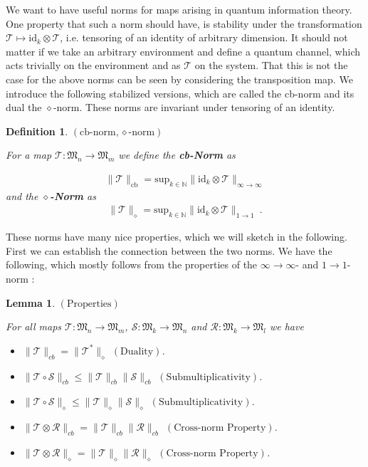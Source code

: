 \documentclass[a4paper
               ,12pt
               ,DIV=12
               ,oneside
               ]
               {amsart}
\theoremstyle{plain}
\newtheorem{lem}{Lemma}
\newtheorem{defn}{Definition}
\theoremstyle{remark}
\def\ra{\rightarrow}
\def\lb{\left(}
\def\rb{\right)}
\def\i{\text{id}}
\newcommand\N{\mathbb{N}}
\newcommand\M{\mathfrak{M}}
\newcommand{\Tm}{\mathcal{T}}
\newcommand{\Rm}{\mathcal{R}}
\newcommand{\Sm}{\mathcal{S}}
\begin{document}
We want to have useful norms for maps arising in quantum information theory. One property that such a norm should have, is stability under the transformation $\Tm\mapsto \i_k\otimes \Tm$, i.e. tensoring of an identity of arbitrary dimension. It should not matter if we take an arbitrary environment and define a quantum channel, which acts trivially on the environment and as $\Tm$ on the system. That this is not the case for the above norms can be seen by considering the transposition map. We introduce the following stabilized versions, which are called the cb-norm and its dual the $\diamond$-norm. These norms are invariant under tensoring of an identity.

\begin{defn}$\lb\text{cb-norm},\diamond\text{-norm}\rb$

For a map $\Tm :\M_n\ra \M_m$ we define the \textbf{cb-Norm} as

\begin{align*}
\| \Tm\|_{\text{cb}} = \text{sup}_{k\in\N} \|\i_k\otimes \Tm\|_{\infty\ra\infty}
\end{align*}
and the $\diamond$\textbf{-Norm} as
\begin{align*}
\| \Tm\|_{\diamond} = \text{sup}_{k\in\N} \|\i_k\otimes \Tm\|_{1\ra 1}\medspace.
\end{align*}

\end{defn}

These norms have many nice properties, which we will sketch in the following. First we can establish the connection between the two norms. We have the following, which mostly follows from the properties of the $\infty\ra\infty$- and $1\ra 1$-norm :

\begin{lem}$\lb \text{Properties}\rb$

For all maps $\Tm :\M_n\ra\M_m$, $\Sm:\M_k\ra\M_n$ and $\Rm:\M_k\ra\M_l$ we have

\begin{itemize}
\item $\| \Tm\|_{cb} = \| \Tm^{*}\|_{\diamond}$ $\lb\text{Duality}\rb$.
\item $\| \Tm\circ \Sm\|_{cb}\leq \| \Tm\|_{cb}\| \Sm\|_{cb}$ $\lb\text{Submultiplicativity}\rb$.
\item $\| \Tm\circ \Sm\|_{\diamond}\leq \| \Tm\|_{\diamond}\| \Sm\|_{\diamond}$ $\lb\text{Submultiplicativity}\rb$.
\item $\| \Tm\otimes \Rm\|_{cb}= \| \Tm\|_{cb}\| \Rm\|_{cb}$ $\lb\text{Cross-norm Property}\rb$.
\item $\| \Tm\otimes \Rm\|_{\diamond}= \| \Tm\|_{\diamond}\| \Rm\|_{\diamond}$ $\lb\text{Cross-norm Property}\rb$.
\end{itemize}

\end{lem}
\end{document}
